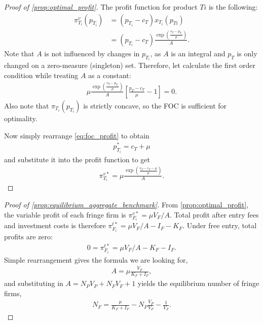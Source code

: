 \documentclass[a4paper]{article}
\begin{document}
\begin{proof}[Proof of \cref{prop:optimal_profit}]
    The profit function for product $Ti$ is the following:
    \begin{align*}
        \pi^v_{T_i}(p_{T_i}) &= (p_{T_i} - c_T) x_{T_i}(p_{Ti}) \\
        &= (p_{T_i} - c_T) \frac{\exp\left( \frac{v_T - p_{T_i}}{\mu} \right)}{A}.
    \end{align*}
    Note that $A$ is not influenced by changes in $p_{T_i}$, as $A$ is an integral and $p_T$ is only changed on a zero-measure (singleton) set.
    Therefore, let calculate the first order condition while treating $A$ as a constant:
    \begin{align}
        \label{eq:foc_profit}
        \mu \frac{\exp\left( \frac{v_T - p_{T_i}}{\mu} \right)}{A} \left[ \frac{p_T - c_T}{\mu} - 1 \right] = 0.
    \end{align}
    Also note that $\pi_{T_i}(p_{T_i})$ is strictly concave, so the FOC is sufficient for optimality.

    Now simply rearrange \cref{eq:foc_profit} to obtain
    \begin{align*}
        p_{T_i}^* = c_T + \mu
    \end{align*}
    and substitute it into the profit function to get
    \begin{align*}
        \pi_{T_i}^{v*} = \mu \frac{\exp \left( \frac{v_T - c_T - \mu}{\mu} \right)}{A}.
    \end{align*}
\end{proof}

\begin{proof}[Proof of \cref{prop:equilibrium_aggregate_benchmark}]
    From \cref{prop:optimal_profit}, the variable profit of each fringe firm is $\pi_{F_i}^{v*} = \mu V_F / A$.
    Total profit after entry fees and investment costs is therefore $\pi_{F_i}^{t*} = \mu V_F / A - I_F - K_F$.
    Under free entry, total profits are zero:
    \begin{align*}
        0 = \pi_{F_i}^{t*} = \mu V_F / A - K_F - I_F.
    \end{align*}
    Simple rearrangement gives the formula we are looking for,
    \begin{align*}
        A = \mu \frac{V_F}{K_F + I_F},
    \end{align*}
    and substituting in $A = N_P V_P + N_F V_F + 1$ yields the equilibrium number of fringe firms,
    \begin{align*}
        N_F = \frac{\mu}{K_F + I_F} - N_P \frac{V_P}{V_F} - \frac{1}{V_F}.
    \end{align*}
\end{proof}
\end{document}
